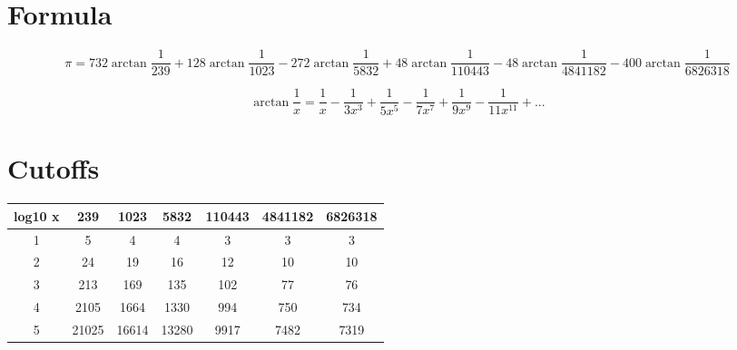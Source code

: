 \documentclass[8pt, letterpaper]{article}
\begin{document}
\section{Formula}
\[ \pi = 732 \arctan \frac{1}{239} + 128 \arctan \frac{1}{1023} - 272 \arctan \frac{1}{5832} + 48 \arctan \frac{1}{110443} - 48 \arctan \frac{1}{4841182} - 400 \arctan \frac{1}{6826318} \]

\[ \arctan \frac{1}{x} = \frac{1}{x} - \frac{1}{3x^{3}} + \frac{1}{5x^{5}} - \frac{1}{7x^{7}} + \frac{1}{9x^{9}} - \frac{1}{11x^{11}} + ... \]

\section{Cutoffs}
\begin{tabular}{ c|c|c|c|c|c|c }
    log10 x & 239 & 1023 & 5832 & 110443 & 4841182 & 6826318 \\
    \hline
    1 & 5 & 4 & 4 & 3 & 3 & 3 \\
    2 & 24 & 19 & 16 & 12 & 10 & 10 \\
    3 & 213 & 169 & 135 & 102 & 77 & 76 \\
    4 & 2105 & 1664 & 1330 & 994 & 750 & 734 \\
    5 & 21025 & 16614 & 13280 & 9917 & 7482 & 7319
\end{tabular}
\end{document}
